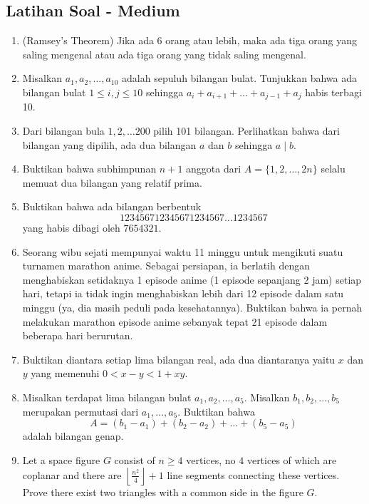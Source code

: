 \documentclass[11pt]{scrartcl}
\begin{document}
\subsection{Latihan Soal - Medium}
\begin{enumerate}
    \item (Ramsey's Theorem) Jika ada 6 orang atau lebih, maka ada tiga orang yang saling mengenal atau ada tiga orang yang tidak saling mengenal.

    \item Misalkan $a_1, a_2, \dots, a_{10}$ adalah sepuluh bilangan bulat. Tunjukkan bahwa ada bilangan bulat $1 \le i,j \le 10$ sehingga $a_i+a_{i+1}+\dots+a_{j-1}+a_j$ habis terbagi 10.

    \item Dari bilangan bula $1,2,\dots 200$ pilih 101 bilangan. Perlihatkan bahwa dari bilangan yang dipilih, ada dua bilangan $a$ dan $b$ sehingga $a \mid b$.

    \item Buktikan bahwa subhimpunan $n+1$ anggota dari $A=\{1,2,\dots, 2n\}$ selalu memuat dua bilangan yang relatif prima.

    \item Buktikan bahwa ada bilangan berbentuk $$123456712345671234567\dots1234567$$
    yang habis dibagi oleh $7654321$.

    \item Seorang wibu sejati mempunyai waktu 11 minggu untuk mengikuti suatu turnamen marathon anime. Sebagai persiapan, ia berlatih dengan menghabiskan setidaknya 1 episode anime (1 episode sepanjang 2 jam) setiap hari, tetapi ia tidak ingin menghabiskan lebih dari 12 episode dalam satu minggu (ya, dia masih peduli pada kesehatannya). Buktikan bahwa ia pernah melakukan marathon episode anime sebanyak tepat 21 episode dalam beberapa hari berurutan.

    \item Buktikan diantara setiap lima bilangan real, ada dua diantaranya yaitu $x$ dan $y$ yang memenuhi $0 < x-y < 1+xy$.

    \item Misalkan terdapat lima bilangan bulat $a_1, a_2, \dots, a_5$. Misalkan $b_1,b_2,\dots,b_5$ merupakan permutasi dari $a_1,\dots,a_5$. Buktikan bahwa 
    $$A=(b_1-a_1)+(b_2-a_2)+\dots+(b_5-a_5)$$ adalah bilangan genap.

    \item Let a space figure $G$ consist of $n \ge 4$ vertices, no $4$ vertices of which are coplanar and there are $\left\lfloor \frac{n^2}{4} \right\rfloor + 1$ line segments connecting these vertices. Prove there exist two triangles with a common side in the figure $G$.
    

\end{enumerate}
\end{document}
